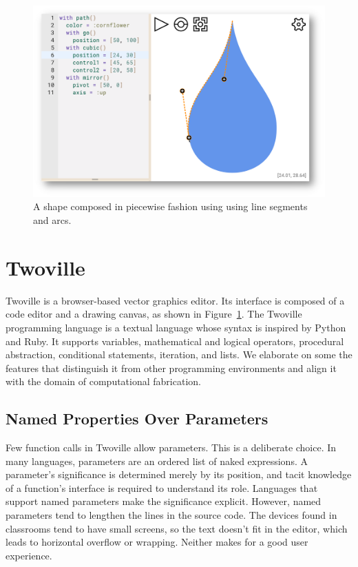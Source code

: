 \begin{figure}
\centering
\includegraphics[width=\linewidth]{pixels/droplet}
\caption{A shape composed in piecewise fashion using using line segments and arcs.}
\label{figure:droplet}
\end{figure}

\section{Twoville}
\label{section:language}

Twoville is a browser-based vector graphics editor. Its interface is composed of a code editor and a drawing canvas, as shown in Figure~\ref{figure:droplet}. The Twoville programming language is a textual language whose syntax is inspired by Python and Ruby. It supports variables, mathematical and logical operators, procedural abstraction, conditional statements, iteration, and lists. We elaborate on some the features that distinguish it from other programming environments and align it with the domain of computational fabrication.

\subsection{Named Properties Over Parameters}

Few function calls in Twoville allow parameters. This is a deliberate choice. In many languages, parameters are an ordered list of naked expressions. A parameter's significance is determined merely by its position, and tacit knowledge of a function's interface is required to understand its role. Languages that support named parameters make the significance explicit. However, named parameters tend to lengthen the lines in the source code. The devices found in classrooms tend to have small screens, so the text doesn't fit in the editor, which leads to horizontal overflow or wrapping. Neither makes for a good user experience.

